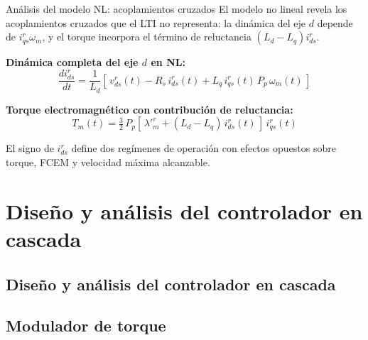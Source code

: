 \documentclass[aspectratio=169,t]{beamer}
\newcommand{\SecPresentacion}{Presentación del problema}
\newcommand{\SecMecanico}{Subsistema mecánico equivalente}
\newcommand{\SecElectromagnetico}{Subsistema electromagnético en coordenadas qd0}
\newcommand{\SecTermico}{Subsistema térmico}
\newcommand{\SecNLGlobal}{Sistema No Lineal Global}
\newcommand{\SecLPV}{Linealización Jacobiana (LPV)}
\newcommand{\SecLTI}{Obtención del modelo LTI equivalente}
\newcommand{\SecAnalisisLTI}{Análisis del modelo LTI aumentado}
\newcommand{\SecDinamica}{Respuesta dinámica en dominio del tiempo}
\newcommand{\SecControlador}{Diseño y análisis del controlador en cascada}
\newcommand{\SecVerifSpecs}{Verificación de desempeño: Especificaciones de operación}
\newcommand{\SecVerifOffset}{Verificación de desempeño: Offset de estado estacionario}
\newcommand{\SecVerifNoIdealidades}{Verificación de desempeño: No idealidades y comportamiento térmico}
\newcommand{\SecDiscretizacion}{Discretización del controlador}
\newcommand{\SecSoftware}{Codificación del software de control}
\newcommand{\AgendaItem}[3]{%
  \ifnum#1=#2
    {\scriptsize\bfseries\color{uncBlue}%
      \hyperlink{sec:#1}{\makebox[2.2em][r]{#1.}\hspace{0.7em}%
      \parbox[t]{0.86\textwidth}{#3}}\par}%
  \else
    {\scriptsize\color{black!26}%
      \hyperlink{sec:#1}{\makebox[2.2em][r]{#1.}\hspace{0.7em}%
      \parbox[t]{0.86\textwidth}{#3}}\par}%
  \fi
  \vspace{0.35mm}%
}
\newcommand{\AgendaBody}[1]{%
    \vspace{3mm}
    {\Large\bfseries\color{uncBlue}Tabla de contenidos\par}
    \vspace{2mm}
    \begin{minipage}{0.94\textwidth}
      \AgendaItem{1}{#1}{\SecPresentacion}
      \AgendaItem{2}{#1}{\SecMecanico}
      \AgendaItem{3}{#1}{\SecElectromagnetico}
      \AgendaItem{4}{#1}{\SecTermico}
      \AgendaItem{5}{#1}\SecNLGlobal
      \AgendaItem{6}{#1}{\SecLPV}
      \AgendaItem{7}{#1}{\SecLTI}
      \AgendaItem{8}{#1}{\SecAnalisisLTI}
      \AgendaItem{9}{#1}{\SecDinamica}
      \AgendaItem{10}{#1}{\SecControlador}
      \AgendaItem{11}{#1}{\SecVerifSpecs}
      \AgendaItem{12}{#1}{\SecVerifOffset}
      \AgendaItem{13}{#1}{\SecVerifNoIdealidades}
      \AgendaItem{14}{#1}{\SecDiscretizacion}
      \AgendaItem{15}{#1}{\SecSoftware}
    \end{minipage}
    \vfill
}
\newcommand{\AgendaSlideTarget}[2]{%
  \begin{frame}[plain]
    \hypertarget{#2}{}%
    \AgendaBody{#1}
  \end{frame}
}
\newcommand{\StartProjectSection}[2]{%
  \section{#2}%
  \subsection{#2}%
  \AgendaSlideTarget{#1}{sec:#1}%
}
\begin{document}
\begin{frame}{Análisis del modelo NL: acoplamientos cruzados}
{\small\color{uncGray}El modelo no lineal revela los acoplamientos cruzados que el LTI no representa: la dinámica del eje $d$ depende de $i_{qs}^r\omega_m$, y el torque incorpora el término de reluctancia $(L_d-L_q)i_{ds}^{r}$.}\par
\vspace{3mm}

\textbf{Dinámica completa del eje $d$ en NL:}
\begin{equation*}
\frac{di_{ds}^{r}}{dt} = \frac{1}{L_d}\!\left[\,v_{ds}^{r}(t) - R_s\,i_{ds}^{r}(t) + L_q\,i_{qs}^{r}(t)\,P_p\,\omega_m(t)\,\right]
\end{equation*}

\textbf{Torque electromagnético con contribución de reluctancia:}
\begin{equation*}
T_m(t) = \tfrac{3}{2}\,P_p\!\left[\,\lambda'^r_m + (L_d - L_q)\,i_{ds}^{r}(t)\,\right]\,i_{qs}^{r}(t)
\end{equation*}

\vspace{2mm}
{\small El signo de $i_{ds}^{r}$ define dos regímenes de operación con efectos opuestos sobre torque, FCEM y velocidad máxima alcanzable.}
\end{frame}


\StartProjectSection{10}{\SecControlador}
\subsection{Modulador de torque}
\end{document}
